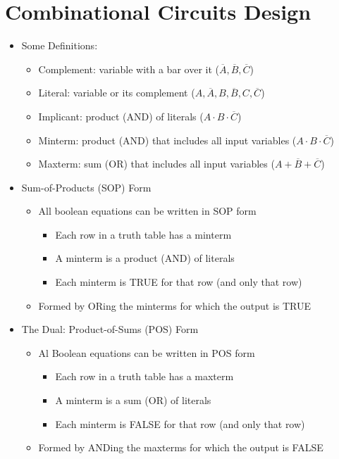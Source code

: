 \documentclass[a4paper]{article}
\begin{document}
\section{Combinational Circuits Design}
\begin{itemize}
\item Some Definitions:
\begin{itemize}
\item Complement: variable with a bar over it ($\overline{A},\overline{B},\overline{C}$)
\item Literal: variable or its complement ($A,\overline{A},B,\overline{B},C,\overline{C}$)
\item Implicant: product (AND) of literals ($A\cdot B\cdot \overline{C}$)
\item Minterm: product (AND) that includes all input variables ($A\cdot B \cdot \overline{C}$)
\item Maxterm: sum (OR) that includes all input variables ($A+\overline{B}+\overline{C}$)
\end{itemize}
\item Sum-of-Products (SOP) Form
\begin{itemize}
\item All boolean equations can be written in SOP form
\begin{itemize}
\item Each row in a truth table has a minterm
\item A minterm is a product (AND) of literals
\item Each minterm is TRUE for that row (and only that row)
\end{itemize}
\item Formed by ORing the minterms for which the output is TRUE
\end{itemize}
\item The Dual: Product-of-Sums (POS) Form
\begin{itemize}
\item Al Boolean equations can be written in POS form
\begin{itemize}
\item Each row in a truth table has a maxterm
\item A minterm is a sum (OR) of literals
\item Each minterm is FALSE for that row (and only that row)
\end{itemize}
\item Formed by ANDing the maxterms for which the output is FALSE
\end{itemize}

\end{itemize}
\end{document}
